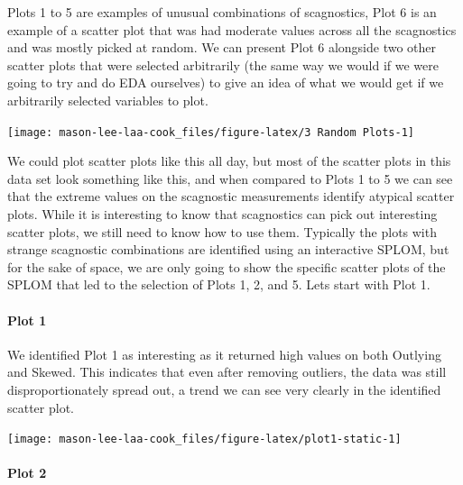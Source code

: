 Plots 1 to 5 are examples of unusual combinations of scagnostics, Plot 6
is an example of a scatter plot that was had moderate values across all
the scagnostics and was mostly picked at random. We can present Plot 6
alongside two other scatter plots that were selected arbitrarily (the
same way we would if we were going to try and do EDA ourselves) to give
an idea of what we would get if we arbitrarily selected variables to
plot.

\begin{Schunk}


\begin{center}\texttt{[image: mason-lee-laa-cook\_files/figure-latex/3 Random Plots-1]} \end{center}

\end{Schunk}

We could plot scatter plots like this all day, but most of the scatter
plots in this data set look something like this, and when compared to
Plots 1 to 5 we can see that the extreme values on the scagnostic
measurements identify atypical scatter plots. While it is interesting to
know that scagnostics can pick out interesting scatter plots, we still
need to know how to use them. Typically the plots with strange
scagnostic combinations are identified using an interactive SPLOM, but
for the sake of space, we are only going to show the specific scatter
plots of the SPLOM that led to the selection of Plots 1, 2, and 5. Lets
start with Plot 1.

\hypertarget{plot-1}{%
\paragraph{Plot 1}\label{plot-1}}

We identified Plot 1 as interesting as it returned high values on both
Outlying and Skewed. This indicates that even after removing outliers,
the data was still disproportionately spread out, a trend we can see
very clearly in the identified scatter plot.

\begin{Schunk}


\begin{center}\texttt{[image: mason-lee-laa-cook\_files/figure-latex/plot1-static-1]} \end{center}

\end{Schunk}

\hypertarget{plot-2}{%
\paragraph{Plot 2}\label{plot-2}}

